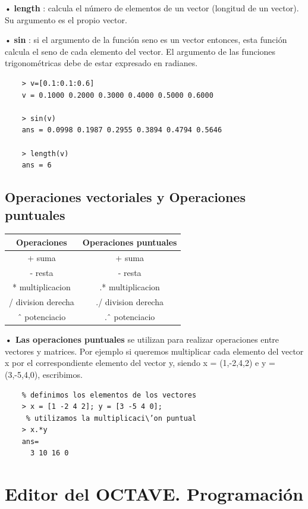 \documentclass[a4,12pt]{article}
\begin{document}
• \textbf{length} : calcula el número de elementos de un vector (longitud de un vector). Su argumento es el propio vector.

• \textbf{sin} : si el argumento de la función seno es un vector entonces, esta función calcula el seno de cada elemento del vector. El argumento de las funciones trigonométricas debe de estar expresado en radianes.
\begin{verbatim}
    > v=[0.1:0.1:0.6]
    v = 0.1000 0.2000 0.3000 0.4000 0.5000 0.6000

    > sin(v)
    ans = 0.0998 0.1987 0.2955 0.3894 0.4794 0.5646

    > length(v)
    ans = 6
\end{verbatim}

\subsection{Operaciones vectoriales y Operaciones puntuales}

\medskip
\begin{center}
\begin{tabular}{|c|c|} \hline
\textbf{Operaciones}   &  \textbf{Operaciones puntuales} \\ \hline
+     suma & +     suma \\  \hline
-     resta & -     resta \\ \hline
*     multiplicacion & .*     multiplicacion \\  \hline
/     division derecha & ./     division derecha \\ \hline
ˆ     potenciacio & .ˆ     potenciacio \\ \hline
\end{tabular}
\end{center}

\textbf{• Las operaciones puntuales} se utilizan para realizar operaciones entre vectores y matrices. Por ejemplo si queremos multiplicar cada elemento del vector x por el correspondiente elemento del vector y, siendo x = (1,-2,4,2) e y = (3,-5,4,0), escribimos.
\begin{verbatim}
    % definimos los elementos de los vectores
    > x = [1 -2 4 2]; y = [3 -5 4 0];
     % utilizamos la multiplicaci\’on puntual
    > x.*y
    ans=
      3 10 16 0
\end{verbatim}

\section{Editor del OCTAVE. Programación}
\end{document}
